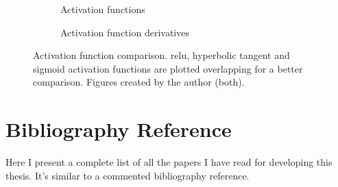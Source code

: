 \begin{figure}[p]
  \centering
  \begin{subfigure}[b]{.475\textwidth}
    \centering
    \caption{Activation functions}
  \end{subfigure}\hfill
  \begin{subfigure}[b]{.475\textwidth}
    \centering
    \caption{Activation function derivatives}
  \end{subfigure}
  \caption[Activation function comparison]{Activation function
    comparison. \Acf{relu}, hyperbolic tangent and sigmoid activation functions
    are plotted overlapping for a better comparison. Figures created by the
    author (both).}%
  \label{fig:activation-functions}
\end{figure}



















\section{Bibliography Reference}


Here I present a complete list of all the papers I have read for developing
this thesis. It's similar to a commented bibliography reference.
